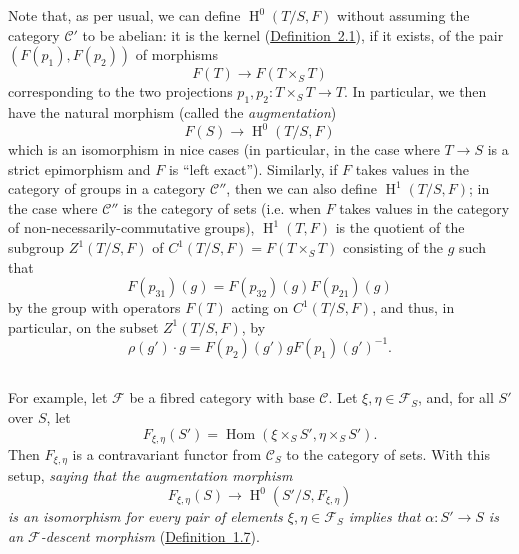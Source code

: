 \documentclass{article}
\renewcommand{\cal}[1]{{\mathcal{#1}}}
\DeclareMathOperator{\Hom}{Hom}
\DeclareMathOperator{\HH}{H}
\begin{document}
Note that, as per usual, we can define $\HH^0(T/S,F)$ without assuming the category $\cal{C}'$ to be abelian:
it is the kernel (\hyperref[definition:A.2.1]{Definition~2.1}), if it exists, of the pair $(F(p_1),F(p_2))$ of morphisms
\[
  F(T) \to F(T\times_S T)
\]
corresponding to the two projections $p_1,p_2\colon T\times_S T\to T$.
In particular, we then have the natural morphism (called the \emph{augmentation})
\[
  F(S) \to \HH^0(T/S,F)
\]
which is an isomorphism in nice cases (in particular, in the case where $T\to S$ is a strict epimorphism and $F$ is ``left exact'').
Similarly, if $F$ takes values in the category of groups in a category $\cal{C}''$, then we can also define $\HH^1(T/S,F)$;
in the case where $\cal{C}''$ is the category of sets (i.e. when $F$ takes values in the category of non-necessarily-commutative groups), $\HH^1(T,F)$ is the quotient of the subgroup $Z^1(T/S,F)$ of $C^1(T/S,F) = F(T\times_S T)$ consisting of the $g$ such that
\[
  F(p_{31})(g) = F(p_{32})(g) F(p_{21})(g)
\]
by the group with operators $F(T)$ acting on $C^1(T/S,F)$, and thus, in particular, on the subset $Z^1(T/S,F)$, by
\[
  \rho(g')\cdot g = F(p_2)(g') g F(p_1)(g')^{-1}.
\]


\subsection{}
\label{A.4.b}

For example, let $\cal{F}$ be a fibred category with base $\cal{C}$.
Let $\xi,\eta\in\cal{F}_S$, and, for all $S'$ over $S$, let
\[
  F_{\xi,\eta}(S') = \Hom(\xi\times_S S', \eta\times_S S').
\]
Then $F_{\xi,\eta}$ is a contravariant functor from $\cal{C}_S$ to the category of sets.
With this setup, \emph{saying that the augmentation morphism}
\[
  F_{\xi,\eta}(S) \to \HH^0(S'/S,F_{\xi,\eta})
\]
\emph{is an isomorphism for every pair of elements $\xi,\eta\in\cal{F}_S$ implies that $\alpha\colon S'\to S$ is an $\cal{F}$-descent morphism} (\hyperref[definition:A.1.7]{Definition~1.7}).


\subsection{}
\label{A.4.c}
\end{document}
